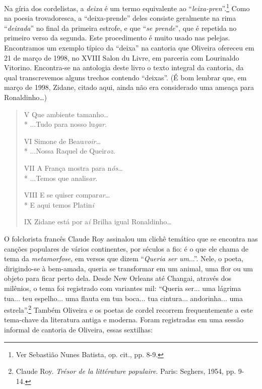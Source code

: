 Na gíria dos cordelistas, a \textit{deixa} é um termo equivalente
ao ``\textit{leixa-pren}''.\footnote{ Ver Sebastião
Nunes Batista, op. cit., pp. 8-9.} Como na poesia trovadoresca, a
``deixa-prende'' deles consiste geralmente na rima
``\textit{deixada}'' no final da primeira estrofe, e que ``\textit{se
prende}'', que é repetida
no primeiro verso da segunda. Este procedimento é muito
usado nas pelejas. Encontramos um exemplo típico da
``deixa'' na cantoria que Oliveira ofereceu em
21 de março de 1998, no XVIII Salon du Livre, em parceria com
Lourinaldo Vitorino. Encontra-se na antologia deste livro
o texto integral da cantoria, da qual transcrevemos alguns
trechos contendo ``deixas''. (É bom lembrar
que, em março de 1998, Zidane, citado aqui, ainda não era considerado
uma ameaça para Ronaldinho\ldots)

\begin{verse}

V
Que ambiente tamanho\ldots\\*
...Tudo para nosso lu\textit{gar}.

VI
Simone de Beau\textit{voir}\ldots\\*
...Nossa Raquel de Queir\textit{oz}.

VII
A França mostra para n\textit{ós}\ldots\\*
...Temos que analis\textit{ar}.

VIII
E se quiser compar\textit{ar}\ldots\\*
E aqui temos Platin\textit{i}

IX
Zidane está por a\textit{í}
Brilha igual Ronaldinho\ldots

\end{verse}

\asterisc

O folclorista francês Claude Roy assinalou um clichê
temático que se encontra nas canções populares de vários
continentes, por séculos a fio: é o que ele chama de tema da
\textit{metamorfose}, em versos que dizem ``\textit{Queria ser
um}...''. Nele,
o poeta, dirigindo-se à bem-amada, queria se transformar em
um animal, uma flor ou um objeto para ficar perto dela. Desde
New Orleans até Changai, através dos milênios, o tema foi
registrado com variantes mil: ``Queria ser... uma lágrima
tua... teu espelho... uma flauta em tua boca... tua cintura...
andorinha... uma estrela''.\footnote{ Claude Roy. \textit{Trésor de
la littérature populaire}. Paris: Seghers, 1954, pp. 9-14.} Também
Oliveira e os poetas de
cordel recorrem frequentemente a este tema-chave da
literatura antiga e moderna. Foram registradas em uma
sessão informal de cantoria de Oliveira, essas sextilhas:

